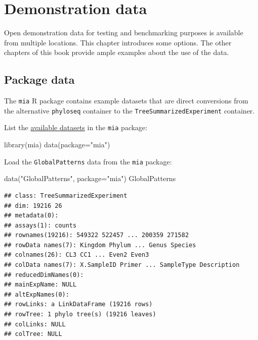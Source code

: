 \documentclass[
]{book}
\newenvironment{Shaded}{\begin{snugshade}}{\end{snugshade}}
\newcommand{\AttributeTok}[1]{\textcolor[rgb]{0.77,0.63,0.00}{#1}}
\newcommand{\FunctionTok}[1]{\textcolor[rgb]{0.00,0.00,0.00}{#1}}
\newcommand{\NormalTok}[1]{#1}
\newcommand{\StringTok}[1]{\textcolor[rgb]{0.31,0.60,0.02}{#1}}
\begin{document}
\hypertarget{example-data}{%
\section{Demonstration data}\label{example-data}}

Open demonstration data for testing and benchmarking purposes is
available from multiple locations. This chapter introduces some
options. The other chapters of this book provide ample examples about
the use of the data.

\hypertarget{package-data}{%
\subsection{Package data}\label{package-data}}

The \texttt{mia} R package contains example datasets that are direct
conversions from the alternative \texttt{phyloseq} container to the
\texttt{TreeSummarizedExperiment} container.

List the \href{https://microbiome.github.io/mia/reference/index.html}{available
datasets} in
the \texttt{mia} package:

\begin{Shaded}
\begin{Highlighting}[]
\FunctionTok{library}\NormalTok{(mia)}
\FunctionTok{data}\NormalTok{(}\AttributeTok{package=}\StringTok{"mia"}\NormalTok{)}
\end{Highlighting}
\end{Shaded}

Load the \texttt{GlobalPatterns} data from the \texttt{mia} package:

\begin{Shaded}
\begin{Highlighting}[]
\FunctionTok{data}\NormalTok{(}\StringTok{"GlobalPatterns"}\NormalTok{, }\AttributeTok{package=}\StringTok{"mia"}\NormalTok{)}
\NormalTok{GlobalPatterns}
\end{Highlighting}
\end{Shaded}

\begin{verbatim}
## class: TreeSummarizedExperiment 
## dim: 19216 26 
## metadata(0):
## assays(1): counts
## rownames(19216): 549322 522457 ... 200359 271582
## rowData names(7): Kingdom Phylum ... Genus Species
## colnames(26): CL3 CC1 ... Even2 Even3
## colData names(7): X.SampleID Primer ... SampleType Description
## reducedDimNames(0):
## mainExpName: NULL
## altExpNames(0):
## rowLinks: a LinkDataFrame (19216 rows)
## rowTree: 1 phylo tree(s) (19216 leaves)
## colLinks: NULL
## colTree: NULL
\end{verbatim}
\end{document}
